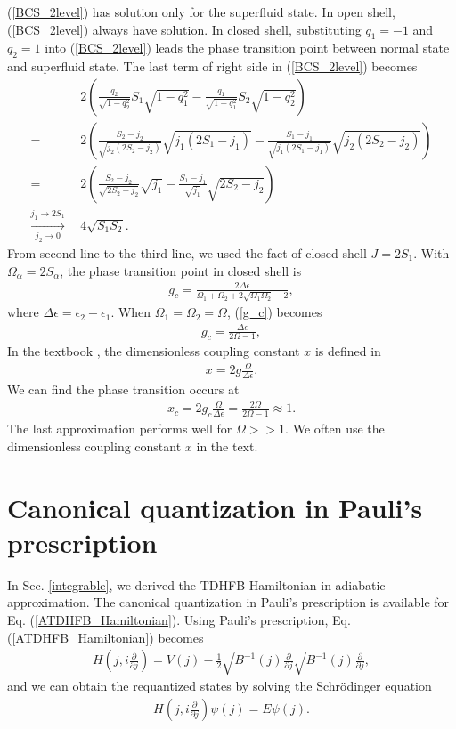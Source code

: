 \documentclass[11pt]{book} %
\begin{document}
(\ref{BCS_2level}) has solution only for the superfluid state. In open shell, (\ref{BCS_2level}) always have solution. In closed shell, substituting $q_1=-1$ and $q_2=1$ into (\ref{BCS_2level}) leads the phase transition point between normal state and superfluid state. The last term of right side in (\ref{BCS_2level}) becomes
\begin{align*}
	& 2\left(\frac{q_2}{\sqrt{1-q_2^2}}S_1\sqrt{1-q_1^2}
	-\frac{q_1}{\sqrt{1-q_1^2}}S_2\sqrt{1-q_2^2}\right) \\
	=\ \ & 2\left(\frac{S_2-j_2}{\sqrt{j_2(2S_2-j_2)}}\sqrt{j_1(2S_1-j_1)}
	- \frac{S_1-j_1}{\sqrt{j_1(2S_1-j_1)}}\sqrt{j_2(2S_2-j_2)}\right) \\
	=\ \ & 2\left(\frac{S_2-j_2}{\sqrt{2S_2-j_2}}\sqrt{j_1}
	- \frac{S_1-j_1}{\sqrt{j_1}}\sqrt{2S_2-j_2}\right) \\ 
	\xrightarrow[j_2\to0]{j_1\to2S_1}\ \ &  4 \sqrt{S_1S_2} .
\end{align*}
From second line to the third line, we used the fact of closed shell $J=2S_1$. With $\Omega_{\alpha}=2S_{\alpha}$, the phase transition point in closed shell is
\begin{align}
	g_c = \frac{2\Delta\epsilon}{\Omega_1+\Omega_2+2\sqrt{\Omega_1\Omega_2}-2} ,
	\label{g_c}
\end{align}
where $\Delta\epsilon=\epsilon_2-\epsilon_1$. When $\Omega_1=\Omega_2=\Omega$, (\ref{g_c}) becomes
\begin{align}
	g_c = \frac{\Delta\epsilon}{2\Omega-1} ,
	\label{g_2}
\end{align}
In the textbook \cite{}, the dimensionless coupling constant $x$ is defined in
\begin{align}
	x = 2g \frac{\Omega}{\Delta\epsilon} .
	\label{x}
\end{align}
We can find the phase transition occurs at
\begin{align}
	x_c = 2g_c \frac{\Omega}{\Delta\epsilon} = \frac{2\Omega}{2\Omega-1} \approx 1.
	\label{x_c}
\end{align}
The last approximation performs well for $\Omega>>1$. We often use the dimensionless coupling constant $x$ in the text. 

\section{Canonical quantization in Pauli's prescription}
\label{can-trans}

In Sec. \ref{integrable}, we derived the TDHFB Hamiltonian in adiabatic approximation. 
The canonical quantization in Pauli's prescription is available for Eq. (\ref{ATDHFB_Hamiltonian}). Using Pauli's prescription, Eq. (\ref{ATDHFB_Hamiltonian}) becomes
\begin{align}
   H \left( j,i\frac{\partial}{\partial j} \right) = V(j) - \frac{1}{2}\sqrt{B^{-1}(j)}\frac{\partial}{\partial j}\sqrt{B^{-1}(j)}\frac{\partial}{\partial j},
\end{align}
and we can obtain the requantized states by solving the Schr\"{o}dinger equation
\begin{align}
   H \left( j,i\frac{\partial}{\partial j} \right) \psi(j) = E \psi(j).
\end{align}
\end{document}
